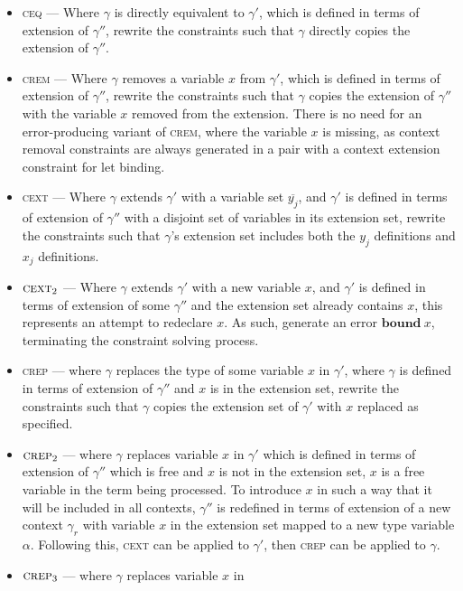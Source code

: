 \documentclass[preprint]{sigplanconf}
\begin{document}
\begin{itemize}
\item \textsc{ceq} --- Where $\gamma$ is directly equivalent
to $\gamma'$, which is defined in terms of extension of
$\gamma''$, rewrite the constraints such that
$\gamma$ directly copies the extension of $\gamma''$.
\item \textsc{crem} --- Where $\gamma$ removes a variable $x$ from $\gamma'$,
which is defined in terms of extension of $\gamma''$, rewrite the
constraints such that $\gamma$ copies the extension of $\gamma''$ with
the variable $x$ removed from the extension. There is no need for an
error-producing variant of \textsc{crem}, where the variable $x$ is missing, 
as context removal constraints are always generated in a pair with a context 
extension constraint for let binding.
\item \textsc{cext} --- Where $\gamma$ extends $\gamma'$ with
a variable set $\overline{y_j}$, and $\gamma'$ is defined in terms of extension of
$\gamma''$ with a disjoint set of variables in its extension set, rewrite the
constraints such that $\gamma$'s extension set includes both the $y_j$
definitions and $x_j$ definitions.
\item $\textsc{cext}_2$ --- Where $\gamma$ extends $\gamma'$ with
a new variable $x$, and $\gamma'$ is defined in terms of extension of
some $\gamma''$ and the extension set already contains $x$, this
represents an attempt to redeclare $x$. As such, generate an error
$\mathbf{bound}\:x$, terminating the constraint solving process.
\item \textsc{crep} --- where $\gamma$ replaces the type of some
variable $x$ in $\gamma'$, where $\gamma$ is defined in terms of extension
of $\gamma''$ and $x$ is in the extension set, rewrite the constraints
such that $\gamma$ copies the extension set of $\gamma'$ with $x$
replaced as specified.
\item $\textsc{crep}_2$ --- where $\gamma$ replaces variable $x$ in
$\gamma'$ which is defined in terms of extension of $\gamma''$
which is free and $x$ is not in the extension set, $x$ is a
free variable in the term being processed. To introduce $x$ in such a way that
it will be included in all contexts, $\gamma''$ is redefined in
terms of extension of a new context $\gamma_r$ with variable $x$
in the extension set mapped to a new type variable $\alpha$. Following
this, \textsc{cext} can be applied to $\gamma'$, then \textsc{crep} can
be applied to $\gamma$.
\item $\textsc{crep}_3$ --- where $\gamma$ replaces variable $x$ in

\end{itemize}
\end{document}
